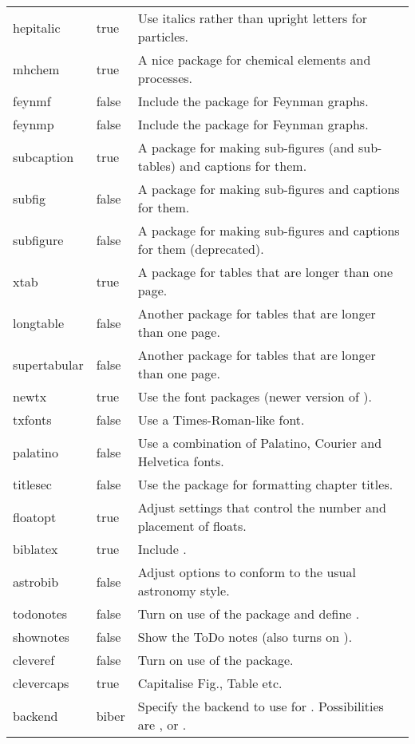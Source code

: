 \begin{xtabular}{llp{11.0cm}}
  hepitalic & true & Use italics rather than upright letters for particles.\\
  mhchem & true & A nice package for chemical elements and processes.\\
  feynmf & false & Include the  package for Feynman graphs.\\
  feynmp & false & Include the  package for Feynman graphs.\\
  subcaption & true & A package for making sub-figures (and sub-tables) and captions for them.\\
  subfig & false & A package for making sub-figures and captions for them.\\
  subfigure & false & A package for making sub-figures and captions for them (deprecated).\\
  xtab & true & A package for tables that are longer than one page.\\
  longtable & false &  Another package for tables that are longer than one page.\\
  supertabular & false &  Another package for tables that are longer than one page.\\
  newtx & true & Use the  font packages (newer version of ).\\
  txfonts & false & Use a Times-Roman-like font.\\
  palatino & false & Use a combination of Palatino, Courier and Helvetica fonts.\\
  titlesec & false & Use the  package for formatting chapter titles.\\
  floatopt & true & Adjust settings that control the number and placement of floats.\\
  biblatex & true & Include .\\
  astrobib & false & Adjust  options to conform to the usual astronomy style.\\
  todonotes & false & Turn on use of the  package and define .\\
  shownotes & false & Show the ToDo notes (also turns on ).\\
  cleveref & false & Turn on use of the  package.\\
  clevercaps & true & Capitalise Fig., Table etc.\\
  backend & biber & Specify the backend to use for .
    Possibilities are ,  or .\\

\end{xtabular}
